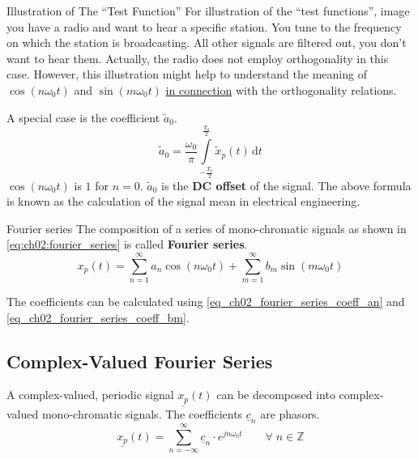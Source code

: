\begin{refsection}
\begin{excursus}{Illustration of The ``Test Function''}
	For illustration of the ``test functions'', image you have a radio and want to hear a specific station. You tune to the frequency on which the station is broadcasting. All other signals are filtered out, you don't want to hear them. Actually, the radio does not employ orthogonality in this case. However, this illustration might help to understand the meaning of $\cos\left(n \omega_0 t\right)$ and $\sin\left(m \omega_0 t\right)$ \underline{in connection} with the orthogonality relations.
\end{excursus}

A special case is the coefficient $\tilde{a}_0$.
\begin{equation}
	\tilde{a}_0 = \frac{\omega_0}{\pi} \int\limits_{-\frac{T_0}{2}}^{\frac{T_0}{2}} \tilde{x}_p(t) \, \mathrm{d} t
\end{equation}
$\cos\left(n \omega_0 t\right)$ is $1$ for $n = 0$. $\tilde{a}_0$ is the  \textbf{\ac{DC} offset} of the signal. The above formula is known as the calculation of the signal mean in electrical engineering.

\begin{definition}{Fourier series}
	The composition of a series of mono-chromatic signals as shown in \eqref{eq:ch02:fourier_series} is called  \textbf{Fourier series}.
	\begin{equation*}
		x_p(t) = \sum\limits_{n=1}^{\infty} a_n \cos\left(n \omega_0 t\right) + \sum\limits_{m=1}^{\infty} b_m \sin\left(m \omega_0 t\right)
	\end{equation*}
	
	The coefficients can be calculated using \eqref{eq_ch02_fourier_series_coeff_an} and \eqref{eq_ch02_fourier_series_coeff_bm}.
\end{definition}

\subsection{Complex-Valued Fourier Series}

A complex-valued, periodic signal $\underline{x_p}(t)$ can be decomposed into complex-valued mono-chromatic signals. The coefficients $\underline{c}_n$ are phasors.
\begin{equation}
	\underline{x_p}(t) = \sum\limits_{n = -\infty}^{\infty} \underline{c}_n \cdot e^{j n \omega_0 t} \qquad \forall \; n \in \mathbb{Z}
	\label{eq:ch02:fourier_series_cmplx}
\end{equation}


\end{refsection}
